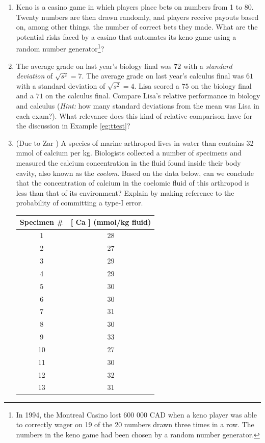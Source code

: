 \documentclass[11pt]{article}
\begin{document}
\begin{enumerate}
\begin{enumerate}
      \item Keno is a casino game in which players place bets on numbers from 1 to 80. Twenty numbers are then drawn randomly, and players receive payouts based on, among other things, the number of correct bets they made. What are the potential risks faced by a casino that automates its keno game using a random number generator\footnote{In 1994, the Montreal Casino lost 600 000 CAD when a keno player was able to correctly wager on 19 of the 20 numbers drawn three times in a row. The numbers in the keno game had been chosen by a random number generator.}?
      \item The average grade on last year's biology final was $72$ with a {\it standard deviation} of $\sqrt{s^2} = 7$. The average grade on last year's calculus final was $61$ with a standard deviation of $\sqrt{s^2}=4$. Lisa scored a $75$ on the biology final and a $71$ on the calculus final. Compare Lisa's relative performance in biology and calculus ({\it Hint:} how many standard deviations from the mean was Lisa in each exam?). What relevance does this kind of relative comparison have for the discussion in Example \ref{eg:ttest}?
      \item (Due to Zar \cite{zar}) A species of marine arthropod lives in water than contains 32 mmol of calcium per kg. Biologists collected a number of specimens and measured the calcium concentration in the fluid found inside their body cavity, also known as the {\it coelom}. Based on the data below, can we conclude that the concentration of calcium in the coelomic fluid of this arthropod is less than that of its environment? Explain by making reference to the probability of committing a type-I error.

        \begin{center}
          \begin{tabular}{cc}
            \hline
            Specimen \# 
                        & [ Ca ] (mmol/kg fluid) \\
                        \hline
            1 & 28 \\
            2 & 27 \\
            3 & 29 \\
            4 & 29 \\
            5 & 30 \\
            6 & 30 \\
            7 & 31 \\
            8 & 30 \\
            9 & 33 \\
            10 & 27 \\
            11 & 30 \\
            12 & 32 \\
            13 & 31 \\
            \hline
          \end{tabular}
        \end{center}	 
    \end{enumerate}


\end{enumerate}
\end{document}
